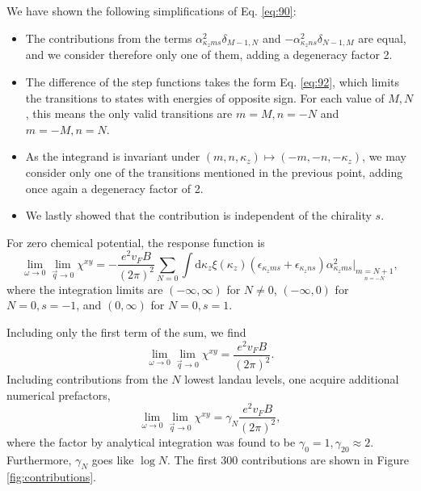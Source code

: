 \begin{Proposition}
  We have shown the following simplifications of Eq. \eqref{eq:90}:
  \begin{itemize}
    \item The contributions from the terms \( \alpha_{\kappa_z m s}^2 \delta_{M-1, N} \) and \( - \alpha_{\kappa_z n s}^2 \delta_{N-1, M} \) are equal, and we consider therefore only one of them, adding a degeneracy factor 2.
    \item The difference of the step functions takes the form Eq. \eqref{eq:92}, which limits the transitions to states with energies of opposite sign.
          For each value of \( M,N \), this means the only valid transitions are \( m=M, n=-N \) and \( m=-M, n=N \).
    \item As the integrand is invariant under \( (m,n,\kappa_z) \mapsto (-m, -n, -\kappa_z) \), we may consider only one of the transitions mentioned in the previous point, adding once again a degeneracy factor of 2.
    \item We lastly showed that the contribution is independent of the chirality \( s \).
  \end{itemize}
\end{Proposition}

For zero chemical potential, the response function is
\begin{equation}
  \label{eq:93}
  \lim_{\omega \to 0} \lim_{\vec{q} \to 0} \chi^{xy} =
  -\frac{e^2 v_F B}{(2 \pi)^2}
  \sum\limits_{N=0} \int \mathrm{d}\kappa_z
  \xi(\kappa_z) (\epsilon_{\kappa_z m s} + \epsilon_{\kappa_z n s})
  \alpha_{\kappa_z m s}^2
  \big|_{\underset{n=-N}{m=N+1}},
\end{equation}
where the integration limits are \( (-\infty, \infty) \) for \( N \neq 0 \), \( (-\infty, 0) \) for \( N = 0, s=-1 \), and \( (0, \infty) \) for \( N=0, s=1 \).

Including only the first term of the sum, we find
\begin{equation}
  \label{eq:94}
  \lim_{\omega \to 0} \lim_{\vec{q} \to 0} \chi^{xy} = \frac{e^2 v_F B}{(2 \pi)^2}.
\end{equation}
Including contributions from the \( N \) lowest landau levels, one acquire additional numerical prefactors,
\begin{equation}
  \label{eq:95}
  \lim_{\omega \to 0} \lim_{\vec{q} \to 0} \chi^{xy} = \gamma_N \frac{e^2 v_F B}{(2 \pi)^2},
\end{equation}
where the factor by analytical integration was found to be \( \gamma_0 = 1, \gamma_{20} \approx 2 \).
Furthermore, \( \gamma_N \) goes like \( \log N \).
The first 300 contributions are shown in Figure \ref{fig:contributions}.

